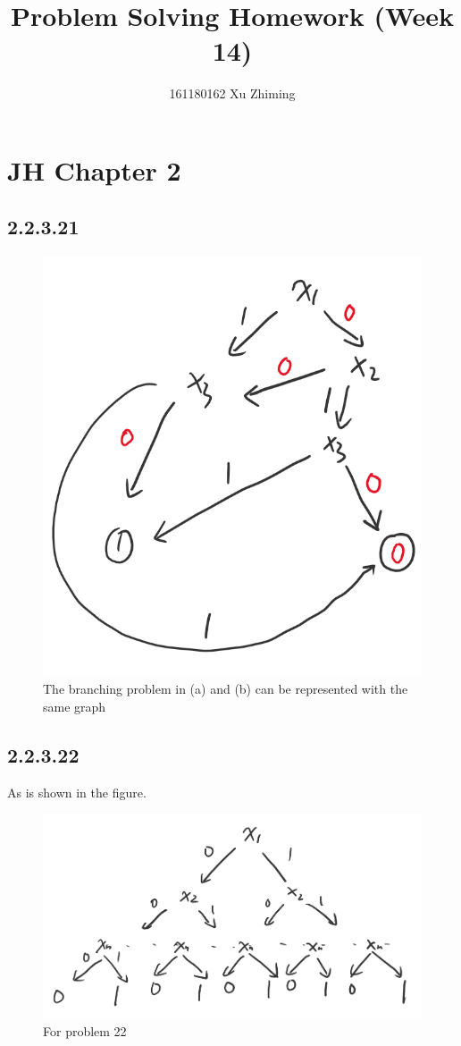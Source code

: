\documentclass[twocolumn]{article}
\begin{document}
	\title{Problem Solving Homework (Week 14)}\author{161180162 Xu Zhiming}\maketitle
	\section*{JH Chapter 2}
	\subsection*{2.2.3.21}
		\begin{figure}[H]
			\centering
			\includegraphics[width=0.7\linewidth]{hw14-1}
			\caption{The branching problem in (a) and (b) can be represented with the same graph}
		\end{figure}
		
	\subsection*{2.2.3.22}
	As is shown in the figure.
	\begin{figure}[H]
		\centering
		\includegraphics[width=1\linewidth]{hw14-2}
		\caption{For problem 22}
	\end{figure}
\end{document}

